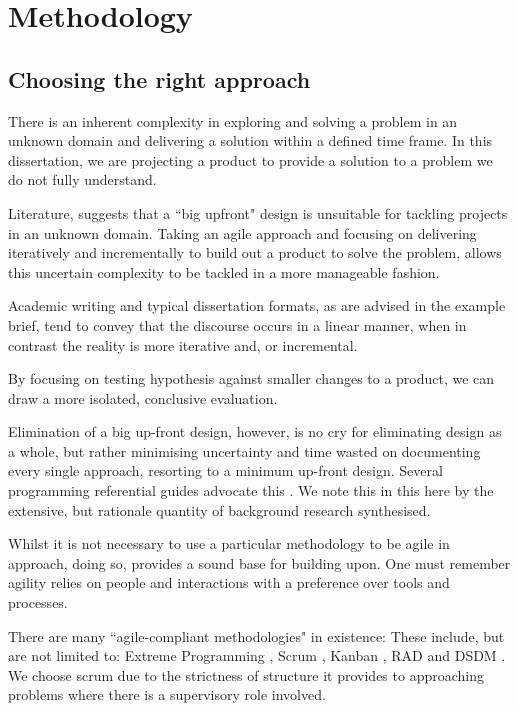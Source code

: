 \chapter{Methodology}

\section{Choosing the right approach}

There is an inherent complexity in exploring and solving a problem in an unknown domain and delivering a solution within a defined time frame. In this dissertation, we are projecting a product to provide a solution to a problem we do not fully understand. 

Literature, suggests that a ``big upfront" design is unsuitable for tackling projects in an unknown domain. Taking an agile approach and focusing on delivering iteratively and incrementally to build out a product to solve the problem, allows this uncertain complexity to be tackled in a more manageable fashion. 

Academic writing and typical dissertation formats, as are advised in the example brief, tend to convey that the discourse occurs in a linear manner, when in contrast the reality is more iterative and, or incremental.

By focusing on testing hypothesis against smaller changes to a product, we can draw a more isolated, conclusive evaluation. 

Elimination of a big up-front design, however, is no cry for eliminating design as a whole, but rather minimising uncertainty and time wasted on documenting every single approach, resorting to a minimum up-front design. Several programming referential guides advocate this \parencite{codeComplete}. We note this in this  here by the extensive, but rationale quantity of background research synthesised.

Whilst it is not necessary to use a particular methodology to be agile in approach, doing so, provides a sound base for building upon. One must remember agility relies on people and interactions with a preference over tools and processes. 

There are many ``agile-compliant methodologies" in existence: These include, but are not limited to: Extreme Programming \parencite{beck2000extreme}, Scrum \parencite{schwaber2017definitive}, Kanban \parencite{anderson2010kanban}, RAD \parencite{martin1991rapid} and DSDM \parencite{dsdm1995dynamic}. We choose scrum due to the strictness of structure it provides to approaching problems where there is a supervisory role involved. 

